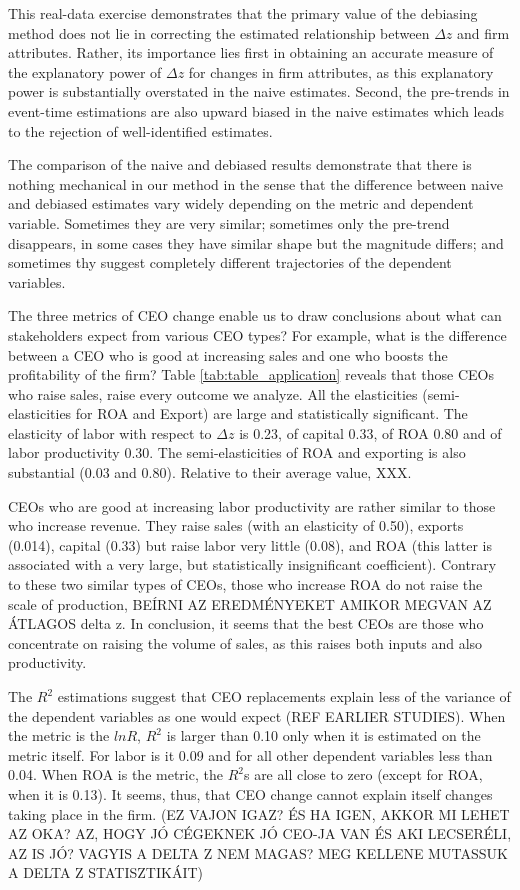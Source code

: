 \documentclass[11pt,a4paper]{article}
\begin{document}
This real-data exercise demonstrates that the primary value of the debiasing method does not lie in correcting the estimated relationship between $\Delta z$ and firm attributes. Rather, its importance lies first in obtaining an accurate measure of the explanatory power of $\Delta z$ for changes in firm attributes, as this explanatory power is substantially overstated in the naive estimates. Second, the pre-trends in event-time estimations are also upward biased in the naive estimates which leads to the rejection of well-identified estimates.

The comparison of the naive and debiased results demonstrate that there is nothing mechanical in our method in the sense that the difference between naive and debiased estimates vary widely depending on the metric and dependent variable. Sometimes they are very similar; sometimes only the pre-trend disappears, in some cases they have similar shape but the magnitude differs; and sometimes thy suggest completely different trajectories of the dependent variables.

The three metrics of CEO change enable us to draw conclusions about what can stakeholders expect from various CEO types? For example, what is the difference between a CEO who is good at increasing sales and one who boosts the profitability of the firm? Table \ref{tab:table_application} reveals that those CEOs who raise sales, raise every outcome we analyze. All the elasticities (semi-elasticities for ROA and Export) are large and statistically significant. The elasticity of labor with respect to $\Delta z$ is 0.23, of capital 0.33, of ROA 0.80 and of labor productivity 0.30. The semi-elasticities of ROA and exporting is also substantial (0.03 and 0.80). Relative to their average value, XXX.

CEOs who are good at increasing labor productivity are rather similar to those who increase revenue. They raise sales (with an elasticity of 0.50), exports (0.014), capital (0.33) but raise labor very little (0.08), and ROA (this latter is associated with a very large, but statistically insignificant coefficient). Contrary to these two similar types of CEOs, those who increase ROA do not raise the scale of production, BEÍRNI AZ EREDMÉNYEKET AMIKOR MEGVAN AZ ÁTLAGOS delta z. In conclusion, it seems that the best CEOs are those who concentrate on raising the volume of sales, as this raises both inputs and also productivity. 

The $R^2$ estimations suggest that CEO replacements explain less of the variance of the dependent variables as one would expect (REF EARLIER STUDIES). When the metric is the $lnR$, $R^2$ is larger than 0.10 only when it is estimated on the metric itself. For labor is it 0.09 and for all other dependent variables less than 0.04. When ROA is the metric, the $R^2$s are all close to zero (except for ROA, when it is 0.13). It seems, thus, that CEO change cannot explain itself changes taking place in the firm. (EZ VAJON IGAZ? ÉS HA IGEN, AKKOR MI LEHET AZ OKA? AZ, HOGY JÓ CÉGEKNEK JÓ CEO-JA VAN ÉS AKI LECSERÉLI, AZ IS JÓ? VAGYIS A DELTA Z NEM MAGAS? MEG KELLENE MUTASSUK A DELTA Z STATISZTIKÁIT)
\end{document}
